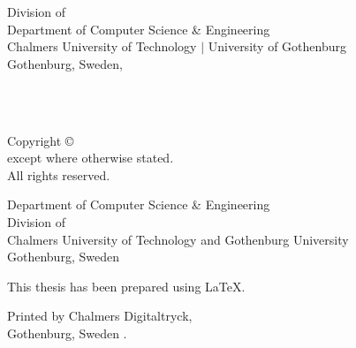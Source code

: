 \begin{center}
Division of \division \\
Department of Computer Science \& Engineering\\
Chalmers University of Technology $|$ University of Gothenburg\\
Gothenburg, Sweden, \currentyear \\
\end{center}

\newpage
\thispagestyle{plain}

\vspace{2cm} \noindent \textbf
\mytitle\\

\noindent
\textsc{\authorname}\\

\vfill

\noindent
Copyright \copyright \currentyear \space \authorname \\
except where otherwise stated. \\
All rights reserved. \vspace{1cm}

\noindent \reportNoText
Department of Computer Science \& Engineering\\
Division of \division \\
Chalmers University of Technology and Gothenburg University\\
Gothenburg, Sweden\\
\vspace{1cm}

\noindent This thesis has been prepared using \LaTeX.

\noindent
Printed by Chalmers Digitaltryck,\\
Gothenburg, Sweden \currentyear.
